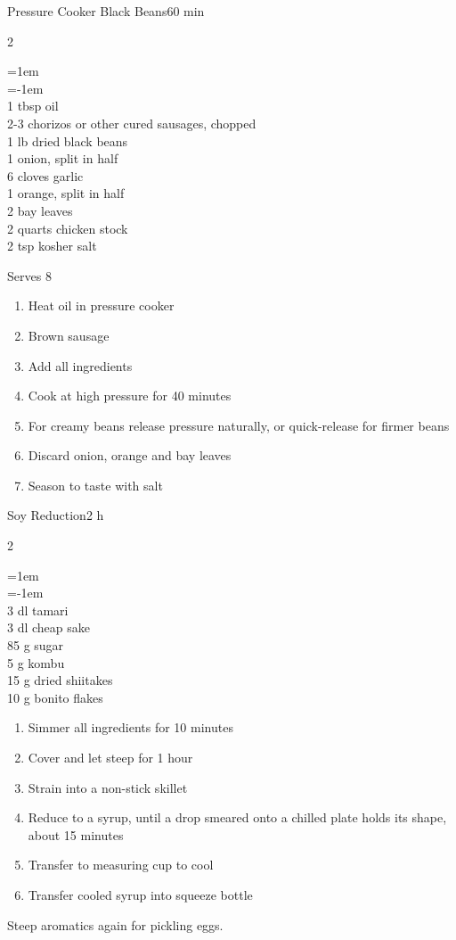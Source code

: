 \documentclass{article}
\newenvironment{recipe}[3][]
    {\begin{cardbase}[#1]{#2}{#3}
    \columnratio{0.333}
    \begin{paracol}{2}}
    {\end{paracol}\end{cardbase}}
\newcommand{\nextcolumn}{\switchcolumn}
\newenvironment{ingredients}
    {
    \begin{obeylines}
    \vspace{\parskip}
    \setlength{\parskip}{0.25em}
    \vspace{-0.25em}
    \leftskip=1em
    \parindent=-1em}
    {\end{obeylines}}
\newenvironment{steps}
    {\begin{enumerate}[leftmargin=*,topsep=0pt]}
    {\end{enumerate}}
\newcommand{\tag}[1]{\hspace{1em}#1}
\newcommand{\symboltag}[2]{\tag{#1\hspace{0.4em}#2}}
\newcommand{\totaltime}[1]{\symboltag{\raisebox{-0.1em}{\small\StopWatchEnd}}{#1}}
\begin{document}
\begin{recipe}{Pressure Cooker Black Beans}{\totaltime{60 min}}
\begin{ingredients}
1 tbsp oil
2-3 chorizos or other cured sausages, chopped
1 lb dried black beans
1 onion, split in half
6 cloves garlic
1 orange, split in half
2 bay leaves
2 quarts chicken stock
2 tsp kosher salt
\end{ingredients}
\nextcolumn
Serves 8
\begin{steps}
    \item Heat oil in pressure cooker
    \item Brown sausage
    \item Add all ingredients
    \item Cook at high pressure for 40 minutes
    \item For creamy beans release pressure naturally, or quick-release for firmer beans
    \item Discard onion, orange and bay leaves
    \item Season to taste with salt
\end{steps}
\end{recipe}

\begin{recipe}{Soy Reduction}{\totaltime{2 h}}
\begin{ingredients}
3 dl tamari
3 dl cheap sake
85 g sugar
5 g kombu
15 g dried shiitakes
10 g bonito flakes
\end{ingredients}
\nextcolumn
\begin{steps}
    \item Simmer all ingredients for 10 minutes
    \item Cover and let steep for 1 hour
    \item Strain into a non-stick skillet
    \item Reduce to a syrup, until a drop smeared onto a chilled plate holds its shape, about 15 minutes
    \item Transfer to measuring cup to cool
    \item Transfer cooled syrup into squeeze bottle
\end{steps}
Steep aromatics again for pickling eggs.
\end{recipe}
\end{document}
